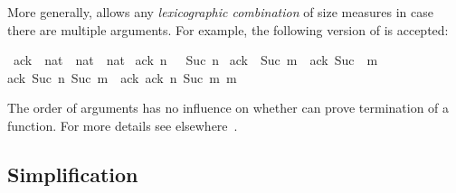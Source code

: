 \begin{isabellebody}
\begin{isamarkuptext}
More generally,  allows any \emph{lexicographic
combination} of size measures in case there are multiple
arguments. For example, the following version of  is accepted:%
\end{isamarkuptext}%
\isamarkuptrue%
\isamarkupfalse%
\ ack{}\ {\isacharcolon}{\isacharcolon}\ {\isachardoublequoteopen}nat\ {\isasymRightarrow}\ nat\ {\isasymRightarrow}\ nat{\isachardoublequoteclose}\ \isanewline
{\isachardoublequoteopen}ack{}\ n\ {}\ {\isacharequal}\ Suc\ n{\isachardoublequoteclose}\ {\isacharbar}\isanewline
{\isachardoublequoteopen}ack{}\ {}\ {\isacharparenleft}Suc\ m{\isacharparenright}\ {\isacharequal}\ ack{}\ {\isacharparenleft}Suc\ {}{\isacharparenright}\ m{\isachardoublequoteclose}\ {\isacharbar}\isanewline
{\isachardoublequoteopen}ack{}\ {\isacharparenleft}Suc\ n{\isacharparenright}\ {\isacharparenleft}Suc\ m{\isacharparenright}\ {\isacharequal}\ ack{}\ {\isacharparenleft}ack{}\ n\ {\isacharparenleft}Suc\ m{\isacharparenright}{\isacharparenright}\ m{\isachardoublequoteclose}%
\begin{isamarkuptext}%
The order of arguments has no influence on whether
 can prove termination of a function. For more details
see elsewhere~\cite{bulwahnKN07}.

\subsection{Simplification}
\label{sec:fun-simplification}


\end{isamarkuptext}
\end{isabellebody}
